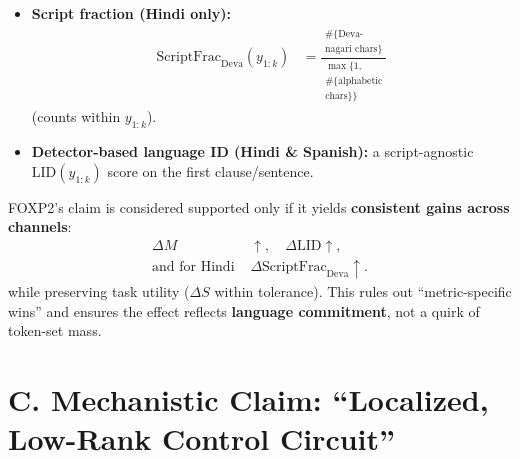\begin{itemize}[leftmargin=1.5em]
\begin{description}
\begin{itemize}[leftmargin=*,itemsep=2pt]
\item \textbf{Script fraction (Hindi only):}
\[
\begin{aligned}
\mathrm{ScriptFrac}_{\mathrm{Deva}}(y_{1:k})
&=
\frac{
\begin{array}{c}
\#\{\text{Deva-}\\
\text{nagari chars}\}
\end{array}
}{
\begin{array}{c}
\max\{1,\\
\#\{\text{alphabetic}\\
\text{chars}\}\}
\end{array}
}
\end{aligned}
\]
(counts within \(y_{1:k}\)).
\item \textbf{Detector-based language ID (Hindi \& Spanish):} a script-agnostic $\mathrm{LID}(y_{1:k})$ score on the first clause/sentence.
\end{itemize}

FOXP2’s claim is considered supported only if it yields \textbf{consistent gains across channels}:
\[
\begin{aligned}
\Delta M &\uparrow,\quad \Delta \mathrm{LID}\uparrow,\\
\text{and for Hindi } &\Delta \mathrm{ScriptFrac}_{\mathrm{Deva}}\uparrow.
\end{aligned}
\]
while preserving task utility ($\Delta S$ within tolerance). This rules out “metric-specific wins” and ensures the effect reflects \textbf{language commitment}, not a quirk of token-set mass.
\end{description}





\end{itemize}

\section*{C. Mechanistic Claim: “Localized, Low-Rank Control Circuit”}

